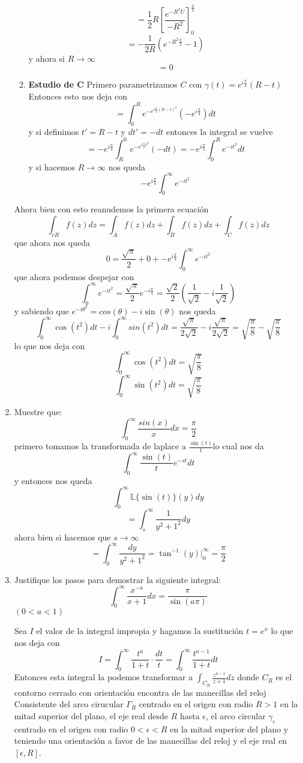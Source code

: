 \documentclass[12pt]{exam}
\begin{document}
\begin{enumerate}
\begin{enumerate}
        $$=\frac{1}{2}R\left[\frac{e^{-R^2U}}{-R^2}\right]_0^\frac{\pi}{2}$$
        $$=-\frac{1}{2R}(e^{-R^2\frac{\pi}{2}}-1)$$
        y ahora si $R\to\infty$
        $$=0$$
        \item \textbf{Estudio de C} Primero parametrizamos $C$ con $\gamma(t)=e^{i\frac{\pi}{4}}(R-t)$
        Entonces esto nos deja con 
        $$=\int_0^R e^{-e^{i\frac{\pi}{2}(R-t)^2}}(-e^{i\frac{\pi}{4}})dt$$
        y si definimos $t' = R-t$ y $dt' = -dt$ entonces la integral se vuelve
        $$=-e^{i\frac{\pi}{4}}\int_R^0 e^{-e^{i\frac{\pi}{2}t^2}}(-dt)=-e^{i\frac{\pi}{4}}\int_0^R e^{-it^2}dt$$
        y si hacemos $R\to\infty$ nos queda
        $$-e^{i\frac{\pi}{4}}\int_0^\infty e^{-it^2}$$
    \end{enumerate}
    Ahora bien con esto reanudemos la primera ecuación
    $$\int_{cR} f(z) dz= \int_A f(z) dz + \int_B f(z) dz + \int_C f(z)dz$$
    que ahora nos queda
    $$0=\frac{\sqrt{\pi}}{2}+0+-e^{i\frac{\pi}{4}}\int_0^\infty e^{-it^2}$$
    que ahora podemos despejar con
    $$\int_0^\infty e^{-it^2}=\frac{\sqrt{\pi}}{2}e^{-i\frac{\pi}{4}}=\frac{\sqrt{2}}{2}(\frac{1}{\sqrt{2}}-i\frac{1}{\sqrt{2}})$$
    y sabiendo que $e^{-i\theta^2}=cos(\theta)-i\sin(\theta)$ nos queda
    $$\int_0^\infty \cos(t^2)dt - i\int_0^\infty sin(t^2)dt = \frac{\sqrt{\pi}}{2\sqrt{2}}-i\frac{\sqrt{\pi}}{2\sqrt{2}}=\sqrt{\frac{\pi}{8}}-\sqrt{\frac{\pi}{8}}$$
    lo que nos deja con
    $$\int_0^\infty \cos(t^2)dt = \sqrt{\frac{\pi}{8}}$$
    $$\int_0^\infty \sin(t^2)dt = \sqrt{\frac{\pi}{8}}$$
    \item Muestre que: $$\int_0^{\infty}\frac{sin(x)}{x}dx = \frac{\pi}{2}$$
    primero tomamos la transformada de laplace a $\frac{\sin(t)}{t}$lo cual nos da
    $$\int_0^\infty \frac{\sin(t)}{t}e^{-st}dt$$ y entonces nos queda
    $$\int_0^\infty \mathbb{L}\{\sin(t)\}(y)dy$$
    $$=\int_s^\infty \frac{1}{y^2+1^2}dy$$
    ahora bien si hacemos que $s\to\infty$
    $$=\int_0^\infty \frac{dy}{y^2+1^2}=\tan^{-1}(y)|_0^\infty = \frac{\pi}{2}$$
    \item Justifique los pasos para demostrar la siguiente integral: $$\int_0^{\infty} \frac{x^{-a}}{x+1}dx=\frac{\pi}{\sin(a\pi)}$$ $(0<a<1)$
    
    Sea $I$ el valor de la integral impropia y hagamos la sustitución $t=e^x$ lo que nos deja con
    $$I = \int_0^\infty \frac{t^a}{1+t}\cdot\frac{dt}{t} = \int_0^\infty \frac{t^{a-1}}{1+t} dt$$
    Entonces esta integral la podemos transformar a $\int_{C_R}\frac{z^{a-1}}{z+1}dz$ donde $C_R$ es el contorno cerrado con orientación encontra de las manecillas del reloj
    Consistente del arco cirucular $\Gamma_R$ centrado en el origen con radio $R>1$ en la mitad superior del plano, el eje real desde $R$ hasta $\epsilon$, el arco circular
    $\gamma_\epsilon$ centrado en el origen con radio $0<\epsilon<R$ en la mitad superior del plano y teniendo una orientación a favor de las manecillas del reloj y el eje real
    en $[\epsilon,R]$.


\end{enumerate}
\end{document}

